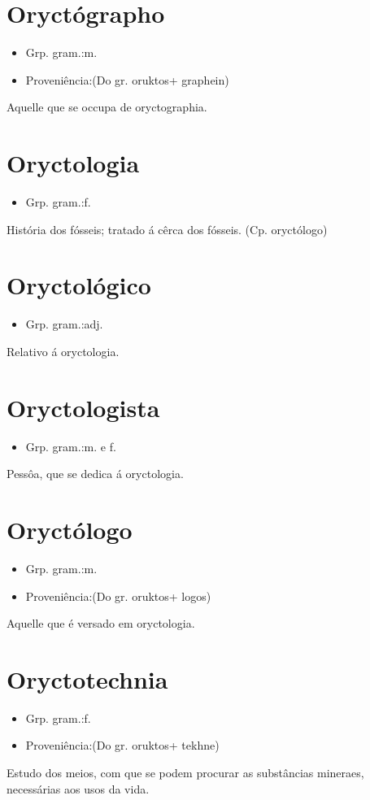 \section{Oryctógrapho}
\begin{itemize}
\item {Grp. gram.:m.}
\end{itemize}
\begin{itemize}
\item {Proveniência:(Do gr. \textunderscore oruktos\textunderscore  + \textunderscore graphein\textunderscore )}
\end{itemize}
Aquelle que se occupa de oryctographia.
\section{Oryctologia}
\begin{itemize}
\item {Grp. gram.:f.}
\end{itemize}
História dos fósseis; tratado á cêrca dos fósseis.
(Cp. \textunderscore oryctólogo\textunderscore )
\section{Oryctológico}
\begin{itemize}
\item {Grp. gram.:adj.}
\end{itemize}
Relativo á oryctologia.
\section{Oryctologista}
\begin{itemize}
\item {Grp. gram.:m.  e  f.}
\end{itemize}
Pessôa, que se dedica á oryctologia.
\section{Oryctólogo}
\begin{itemize}
\item {Grp. gram.:m.}
\end{itemize}
\begin{itemize}
\item {Proveniência:(Do gr. \textunderscore oruktos\textunderscore  + \textunderscore logos\textunderscore )}
\end{itemize}
Aquelle que é versado em oryctologia.
\section{Oryctotechnia}
\begin{itemize}
\item {Grp. gram.:f.}
\end{itemize}
\begin{itemize}
\item {Proveniência:(Do gr. \textunderscore oruktos\textunderscore  + \textunderscore tekhne\textunderscore )}
\end{itemize}
Estudo dos meios, com que se podem procurar as substâncias mineraes, necessárias aos usos da vida.
